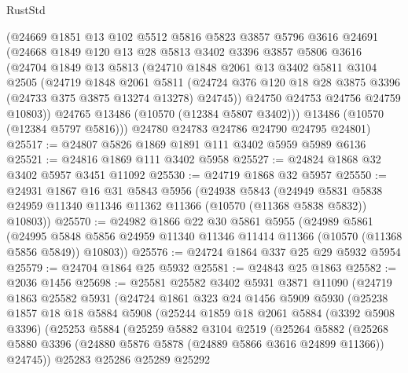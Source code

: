 \begin{lexlean}{RustStd}
\begin{coremodule}
      (@24669
        @1851
        @13
        @102
        @5512
        @5816
        @5823
        @3857
        @5796
        @3616
        @24691
        (@24668
          @1849
          @120
          @13
          @28
          @5813
          @3402
          @3396
          @3857
          @5806
          @3616
          (@24704
            @1849
            @13
            @5813
            (@24710
              @1848
              @2061
              @13
              @3402
              @5811
              @3104
              @2505
              (@24719
                @1848
                @2061
                @5811
                (@24724 @376 @120 @18 @28 @3875 @3396 (@24733 @375 @3875 @13274 @13278) @24745))
              @24750
              @24753
              @24756
              @24759
              @10803))
          @24765
          @13486
          (@10570 (@12384 @5807 @3402)))
        @13486
        (@10570 (@12384 @5797 @5816)))
      @24780
      @24783
      @24786
      @24790
      @24795
      @24801)
@25517 := @24807 @5826 @1869 @1891 @111 @3402 @5959 @5989 @6136
@25521 := @24816 @1869 @111 @3402 @5958
@25527 := @24824 @1868 @32 @3402 @5957 @3451 @11092
@25530 := @24719 @1868 @32 @5957
@25550 := @24931
    @1867
    @16
    @31
    @5843
    @5956
    (@24938
      @5843
      (@24949 @5831 @5838 @24959 @11340 @11346 @11362 @11366 (@10570 (@11368 @5838 @5832)) @10803))
@25570 := @24982
    @1866
    @22
    @30
    @5861
    @5955
    (@24989
      @5861
      (@24995 @5848 @5856 @24959 @11340 @11346 @11414 @11366 (@10570 (@11368 @5856 @5849)) @10803))
@25576 := @24724 @1864 @337 @25 @29 @5932 @5954
@25579 := @24704 @1864 @25 @5932
@25581 := @24843 @25 @1863
@25582 := @2036 @1456
@25698 := @25581
    @25582
    @3402
    @5931
    @3871
    @11090
    (@24719
      @1863
      @25582
      @5931
      (@24724
        @1861
        @323
        @24
        @1456
        @5909
        @5930
        (@25238
          @1857
          @18
          @18
          @5884
          @5908
          (@25244
            @1859
            @18
            @2061
            @5884
            (@3392 @5908 @3396)
            (@25253
              @5884
              (@25259
                @5882
                @3104
                @2519
                (@25264
                  @5882
                  (@25268
                    @5880
                    @3396
                    (@24880 @5876 @5878 (@24889 @5866 @3616 @24899 @11366))
                    @24745))
                @25283
                @25286
                @25289
                @25292

\end{coremodule}
\end{lexlean}
